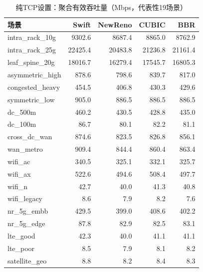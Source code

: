 \documentclass[10pt,twocolumn]{article}
\begin{document}
\begin{table}[htbp]
\centering
\caption{纯TCP设置：聚合有效吞吐量（Mbps，代表性19场景）}
\label{tab:throughput}
\scriptsize
\setlength{\tabcolsep}{3pt}
\begin{tabular}{@{}lrrrr@{}}
\toprule
\textbf{场景} & \textbf{Swift} & \textbf{NewReno} & \textbf{CUBIC} & \textbf{BBR} \\
\midrule
intra\_rack\_10g & 9302.6 & 8687.4 & 8865.0 & 8762.9 \\
intra\_rack\_25g & 22425.4 & 20483.8 & 21236.8 & 21161.4 \\
leaf\_spine\_20g & 18016.7 & 16279.4 & 17545.7 & 16805.3 \\
\midrule
asymmetric\_high & 878.6 & 798.6 & 839.7 & 817.0 \\
congested\_heavy & 454.5 & 406.8 & 430.3 & 429.6 \\
symmetric\_low & 905.0 & 886.5 & 886.5 & 886.5 \\
dc\_500m & 460.2 & 430.5 & 428.8 & 435.0 \\
dc\_100m & 86.7 & 80.1 & 82.2 & 81.1 \\
cross\_dc\_wan & 874.6 & 823.5 & 826.8 & 856.1 \\
wan\_metro & 909.4 & 844.4 & 860.4 & 863.4 \\
\midrule
wifi\_ac & 340.5 & 325.1 & 332.1 & 325.7 \\
wifi\_ax & 522.6 & 494.6 & 508.4 & 497.7 \\
wifi\_n & 42.7 & 40.0 & 41.3 & 40.8 \\
wifi\_legacy & 8.6 & 7.9 & 8.2 & 7.6 \\
nr\_5g\_embb & 429.5 & 399.0 & 408.6 & 402.2 \\
nr\_5g\_edge & 87.8 & 82.9 & 82.5 & 83.1 \\
lte\_good & 42.3 & 40.0 & 41.1 & 41.1 \\
lte\_poor & 8.5 & 7.9 & 8.1 & 8.2 \\
\midrule
satellite\_geo & 8.8 & 8.2 & 8.4 & 8.3 \\
\bottomrule
\end{tabular}
\end{table}
\end{document}
